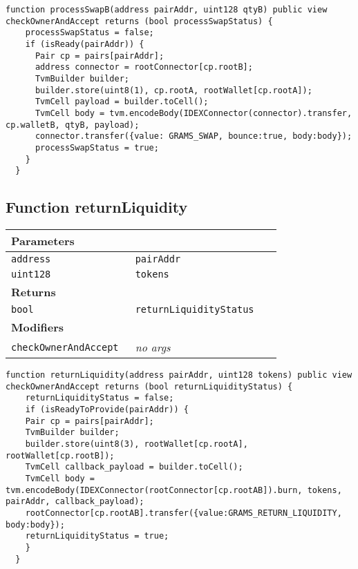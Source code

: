 \vspace{2cm}

\begin{lstlisting}[firstnumber=236]
  function processSwapB(address pairAddr, uint128 qtyB) public view checkOwnerAndAccept returns (bool processSwapStatus) {
    processSwapStatus = false;
    if (isReady(pairAddr)) {
      Pair cp = pairs[pairAddr];
      address connector = rootConnector[cp.rootB];
      TvmBuilder builder;
      builder.store(uint8(1), cp.rootA, rootWallet[cp.rootA]);
      TvmCell payload = builder.toCell();
      TvmCell body = tvm.encodeBody(IDEXConnector(connector).transfer, cp.walletB, qtyB, payload);
      connector.transfer({value: GRAMS_SWAP, bounce:true, body:body});
      processSwapStatus = true;
    }
  }
\end{lstlisting}

\subsection{Function returnLiquidity}


\ifsoltables
\noindent\begin{tabular}{|l|l|p{5cm}|}\hline
\multicolumn{3}{|l|}{\bf Parameters}\\\hline
\tt address & \tt pairAddr &\\\hline
\tt uint128 & \tt tokens &\\\hline
\multicolumn{3}{|l|}{\bf Returns}\\\hline
\tt bool & \tt returnLiquidityStatus &\\\hline
\multicolumn{3}{|l|}{\bf Modifiers}\\\hline
\tt checkOwnerAndAccept & {\em no args} &\\\hline
\end{tabular}
\fi

\vspace{2cm}

\begin{lstlisting}[firstnumber=272]
  function returnLiquidity(address pairAddr, uint128 tokens) public view checkOwnerAndAccept returns (bool returnLiquidityStatus) {
    returnLiquidityStatus = false;
    if (isReadyToProvide(pairAddr)) {
    Pair cp = pairs[pairAddr];
    TvmBuilder builder;
    builder.store(uint8(3), rootWallet[cp.rootA], rootWallet[cp.rootB]);
    TvmCell callback_payload = builder.toCell();
    TvmCell body = tvm.encodeBody(IDEXConnector(rootConnector[cp.rootAB]).burn, tokens, pairAddr, callback_payload);
    rootConnector[cp.rootAB].transfer({value:GRAMS_RETURN_LIQUIDITY, body:body});
    returnLiquidityStatus = true;
    }
  }
\end{lstlisting}

